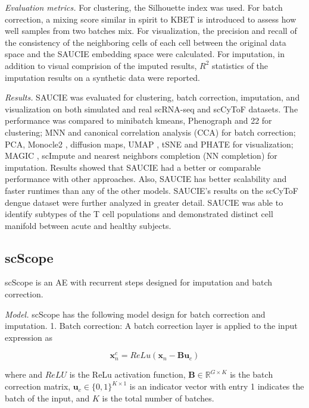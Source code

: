 \documentclass[
]{book}
\begin{document}
\emph{Evaluation metrics.} For clustering, the Silhouette index was used. For batch correction, a mixing score similar in spirit to KBET is introduced to assess how well samples from two batches mix. For visualization, the precision and recall of the consistency of the neighboring cells of each cell between the original data space and the SAUCIE embedding space were calculated. For imputation, in addition to visual comprision of the imputed results, \(R^{2}\) statistics of the imputation results on a synthetic data were reported.

\emph{Results.} SAUCIE was evaluated for clustering, batch correction, imputation, and visualization on both simulated and real scRNA-seq and scCyToF datasets. The performance was compared to minibatch kmeans, Phenograph \citep{RN145} and 22 for clustering; MNN \citep{RN84} and canonical correlation analysis (CCA) \citep{RN79} for batch correction; PCA, Monocle2 \citep{RN150}, diffusion maps, UMAP \citep{RN148}, tSNE \citep{RN147} and PHATE \citep{RN146} for visualization; MAGIC \citep{RN111}, scImpute \citep{RN31} and nearest neighbors completion (NN completion) for imputation. Results showed that SAUCIE had a better or comparable performance with other approaches. Also, SAUCIE has better scalability and faster runtimes than any of the other models. SAUCIE's results on the scCyToF dengue dataset were further analyzed in greater detail. SAUCIE was able to identify subtypes of the T cell populations and demonstrated distinct cell manifold between acute and healthy subjects.

\hypertarget{ch-5-4-4}{%
\subsection{scScope}\label{ch-5-4-4}}

scScope \citep{RN152} is an AE with recurrent steps designed for imputation and batch correction.

\emph{Model.} scScope has the following model design for batch correction and imputation.
1. Batch correction: A batch correction layer is applied to the input expression as

\begin{equation}
\mathbf{x}_{n}^{c}=ReLu(\mathbf{x}_{n}-\boldsymbol{Bu}_{c} ) \label{eq:eq40}
\end{equation}

where and \(ReLU\) is the ReLu activation function, \(\boldsymbol{B} \in \mathbb{R}^{G×K}\) is the batch correction matrix, \(\boldsymbol{u}_c \in \{0,1\}^{K×1}\) is an indicator vector with entry 1 indicates the batch of the input, and \(K\) is the total number of batches.
\end{document}
